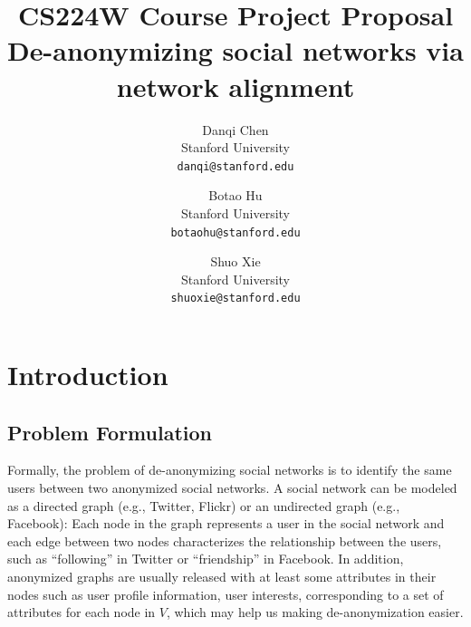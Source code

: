 \documentclass[11pt,letterpaper]{article}
\begin{document}
\title{{CS224W Course Project Proposal \\} \bf De-anonymizing social networks via network alignment}

\author{Danqi Chen\\
Stanford University\\
{\tt\small danqi@stanford.edu}
\and
Botao Hu\\
Stanford University\\
{\tt\small botaohu@stanford.edu}
%
\and
Shuo Xie\\
Stanford University\\
{\tt\small shuoxie@stanford.edu}
}

\maketitle
\thispagestyle{empty}

\maketitle



\section{Introduction}


\subsection{Problem Formulation}
Formally, the problem of de-anonymizing social networks is to identify the same users between two anonymized social networks.  A social network can be modeled as a directed graph (e.g., Twitter, Flickr) or an undirected graph (e.g., Facebook): Each node in the graph represents a user in the social network and each edge between two nodes characterizes the relationship between the users, such as ``following'' in Twitter or ``friendship'' in Facebook. In addition, anonymized graphs are usually released with at least some attributes in their nodes such as user profile information, user interests, corresponding to a set of attributes for each node in $V$, which may help us making de-anonymization easier.
\end{document}
